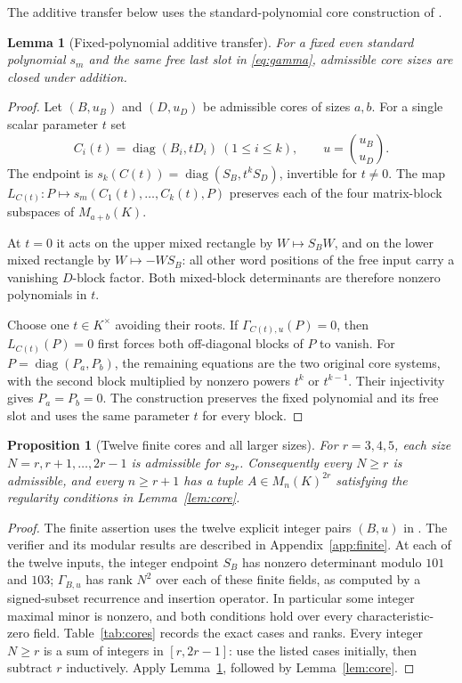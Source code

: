 \documentclass[11pt,reqno]{amsart}
\theoremstyle{plain}
\newtheorem{lemma}[theorem]{Lemma}
\newtheorem{proposition}[theorem]{Proposition}
\theoremstyle{definition}
\numberwithin{equation}{section}
\begin{document}
The additive transfer below uses the standard-polynomial core construction of \cite{Miah2026Standard}.

\begin{lemma}[Fixed-polynomial additive transfer]\label{lem:additive}
For a fixed even standard polynomial $s_m$ and the same free last slot in \eqref{eq:gamma}, admissible core sizes are closed under addition.
\end{lemma}
\begin{proof}
Let $(B,u_B)$ and $(D,u_D)$ be admissible cores of sizes $a,b$.  For a single scalar parameter $t$ set
\[
 C_i(t)=\operatorname{diag}(B_i,tD_i)\ (1\le i\le k),\qquad
 u=\binom{u_B}{u_D}.
\]
The endpoint is $s_k(C(t))=\operatorname{diag}(S_B,t^kS_D)$, invertible for $t\ne0$.  The map $L_{C(t)}:P\mapsto s_m(C_1(t),\ldots,C_k(t),P)$ preserves each of the four matrix-block subspaces of $M_{a+b}(K)$.\par{}
At $t=0$ it acts on the upper mixed rectangle by $W\mapsto S_BW$, and on the lower mixed rectangle by $W\mapsto -WS_B$: all other word positions of the free input carry a vanishing $D$-block factor.  Both mixed-block determinants are therefore nonzero polynomials in $t$.

Choose one $t\in K^\times$ avoiding their roots.  If $\Gamma_{C(t),u}(P)=0$, then $L_{C(t)}(P)=0$ first forces both off-diagonal blocks of $P$ to vanish.  For $P=\operatorname{diag}(P_a,P_b)$, the remaining equations are the two original core systems, with the second block multiplied by nonzero powers $t^k$ or $t^{k-1}$.  Their injectivity gives $P_a=P_b=0$.  The construction preserves the fixed polynomial and its free slot and uses the same parameter $t$ for every block.
\end{proof}

\begin{proposition}[Twelve finite cores and all larger sizes]\label{prop:12}
For $r=3,4,5$, each size $N=r,r+1,\ldots,2r-1$ is admissible for $s_{2r}$.  Consequently every $N\ge r$ is admissible, and every $n\ge r+1$ has a tuple $A\in M_n(K)^{2r}$ satisfying the regularity conditions in Lemma~\ref{lem:core}.
\end{proposition}
\begin{proof}
The finite assertion uses the twelve explicit integer pairs $(B,u)$ in .  The verifier and its modular results are described in Appendix~\ref{app:finite}.  At each of the twelve inputs, the integer endpoint $S_B$ has nonzero determinant modulo $101$ and $103$; $\Gamma_{B,u}$ has rank $N^2$ over each of these finite fields, as computed by a signed-subset recurrence and insertion operator.  In particular some integer maximal minor is nonzero, and both conditions hold over every characteristic-zero field.  Table~\ref{tab:cores} records the exact cases and ranks.  Every integer $N\ge r$ is a sum of integers in $[r,2r-1]$: use the listed cases initially, then subtract $r$ inductively.  Apply Lemma~\ref{lem:additive}, followed by Lemma~\ref{lem:core}.
\end{proof}
\end{document}
